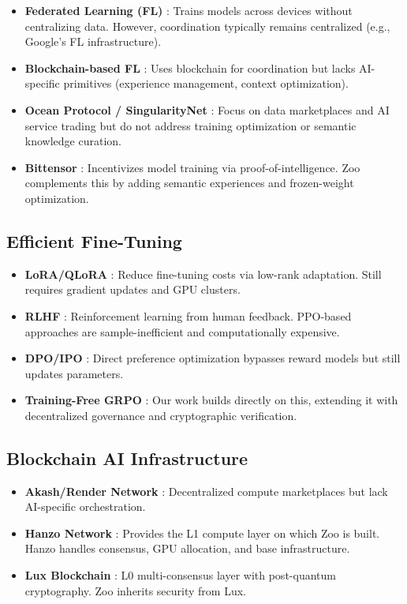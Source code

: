 \documentclass[11pt,a4paper]{article}
\begin{document}
\begin{itemize}[leftmargin=*]
\item \textbf{Federated Learning (FL)} \cite{mcmahan2017federated}: Trains models across devices without centralizing data. However, coordination typically remains centralized (e.g., Google's FL infrastructure).
\item \textbf{Blockchain-based FL} \cite{kim2019blockchained}: Uses blockchain for coordination but lacks AI-specific primitives (experience management, context optimization).
\item \textbf{Ocean Protocol / SingularityNet} \cite{ocean2021whitepaper,singularitynet2021whitepaper}: Focus on data marketplaces and AI service trading but do not address training optimization or semantic knowledge curation.
\item \textbf{Bittensor} \cite{bittensor2021whitepaper}: Incentivizes model training via proof-of-intelligence. Zoo complements this by adding semantic experiences and frozen-weight optimization.
\end{itemize}

\subsection{Efficient Fine-Tuning}

\begin{itemize}[leftmargin=*]
\item \textbf{LoRA/QLoRA} \cite{hu2021lora,dettmers2023qlora}: Reduce fine-tuning costs via low-rank adaptation. Still requires gradient updates and GPU clusters.
\item \textbf{RLHF} \cite{ouyang2022training}: Reinforcement learning from human feedback. PPO-based approaches are sample-inefficient and computationally expensive.
\item \textbf{DPO/IPO} \cite{rafailov2023dpo}: Direct preference optimization bypasses reward models but still updates parameters.
\item \textbf{Training-Free GRPO} \cite{tencent2025grpo}: Our work builds directly on this, extending it with decentralized governance and cryptographic verification.
\end{itemize}

\subsection{Blockchain AI Infrastructure}

\begin{itemize}[leftmargin=*]
\item \textbf{Akash/Render Network} \cite{akash2021whitepaper}: Decentralized compute marketplaces but lack AI-specific orchestration.
\item \textbf{Hanzo Network} \cite{hanzo2025paper}: Provides the L1 compute layer on which Zoo is built. Hanzo handles consensus, GPU allocation, and base infrastructure.
\item \textbf{Lux Blockchain} \cite{lux2025whitepaper}: L0 multi-consensus layer with post-quantum cryptography. Zoo inherits security from Lux.
\end{itemize}
\end{document}
